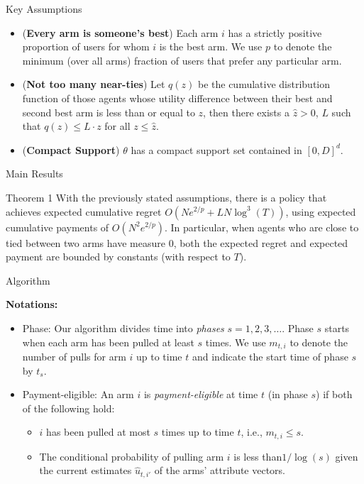 \documentclass[final]{beamer} %
\begin{document}
\begin{frame}[t]
\begin{columns}[t]
\begin{column}{0.28\paperwidth}

\begin{block}{Key Assumptions}
\begin{itemize}[label=\textbullet]
\item (\textbf{Every arm is someone's best}) Each arm $i$ has a strictly positive proportion of users for whom $i$ is the best arm. We use $p$ to denote the minimum (over all arms) fraction of users that prefer any particular arm.
\item (\textbf{Not too many near-ties}) Let $q(z)$ be the cumulative distribution function of those agents whose utility difference between their best and second best arm is less than or equal to $z$, then there exists a $\hat{z}>0$, $L$ such that $q(z)\leq L\cdot z$ for all $z\leq \hat{z}$.
\item (\textbf{Compact Support}) $\theta$ has a compact support set contained in $[0,D]^{d}$.
\end{itemize}
\end{block}

\begin{block}{Main Results}
\begin{alertblock}{Theorem 1}
With the previously stated assumptions, there is a policy that achieves expected 
cumulative regret $O (N e^{2/p} + L N \log^3(T))$,
using expected cumulative payments of $O(N^2 e^{2/p})$.
\newline
\newline
In particular, when agents who are close to tied between two arms have measure $0$,
both the expected regret and expected payment are bounded by constants
(with respect to $T$). 
\end{alertblock}
\end{block}							

\begin{block}{Algorithm}


\textbf{Notations:}
\vspace{0.5cm}
\begin{itemize}[label=\textbullet]
\item Phase: Our algorithm divides time into \emph{phases} $s = 1, 2, 3, \ldots$. Phase $s$ starts when each arm has been pulled at least $s$ times. We use $m_{t,i}$ to denote the number of pulls for arm $i$ up to time $t$ and indicate the start time of phase $s$ by $t_s$. 
\item Payment-eligible: An arm $i$ is \emph{payment-eligible} at time $t$ (in phase $s$) if both of the following hold:
\begin{itemize}[label=\textbullet]
\item $i$ has been pulled at most $s$ times up to time $t$, i.e., $m_{t,i} \leq s$.
\item  The conditional probability of pulling arm $i$ is less than$1/\log(s)$ given the current estimates $\hat{u}_{t,i'}$ of the arms' attribute vectors.  
\end{itemize}
\end{itemize}



\end{block}
\end{column}
\end{columns}
\end{frame}
\end{document}
